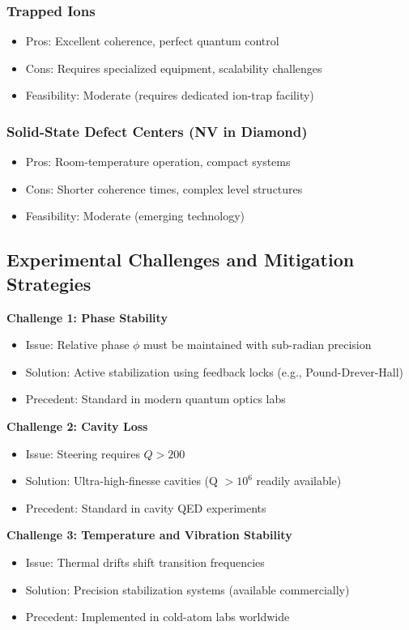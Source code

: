 \subsubsection{Trapped Ions}
\begin{itemize}
	\item Pros: Excellent coherence, perfect quantum control
	\item Cons: Requires specialized equipment, scalability challenges
	\item Feasibility: Moderate (requires dedicated ion-trap facility)
\end{itemize}

\subsubsection{Solid-State Defect Centers (NV in Diamond)}
\begin{itemize}
	\item Pros: Room-temperature operation, compact systems
	\item Cons: Shorter coherence times, complex level structures
	\item Feasibility: Moderate (emerging technology)
\end{itemize}

\subsection{Experimental Challenges and Mitigation Strategies}

\textbf{Challenge 1: Phase Stability}
\begin{itemize}
	\item Issue: Relative phase $\phi$ must be maintained with sub-radian precision
	\item Solution: Active stabilization using feedback locks (e.g., Pound-Drever-Hall)
	\item Precedent: Standard in modern quantum optics labs
\end{itemize}

\textbf{Challenge 2: Cavity Loss}
\begin{itemize}
	\item Issue: Steering requires $Q > 200$
	\item Solution: Ultra-high-finesse cavities (Q $> 10^6$ readily available)
	\item Precedent: Standard in cavity QED experiments
\end{itemize}

\textbf{Challenge 3: Temperature and Vibration Stability}
\begin{itemize}
	\item Issue: Thermal drifts shift transition frequencies
	\item Solution: Precision stabilization systems (available commercially)
	\item Precedent: Implemented in cold-atom labs worldwide
\end{itemize}

